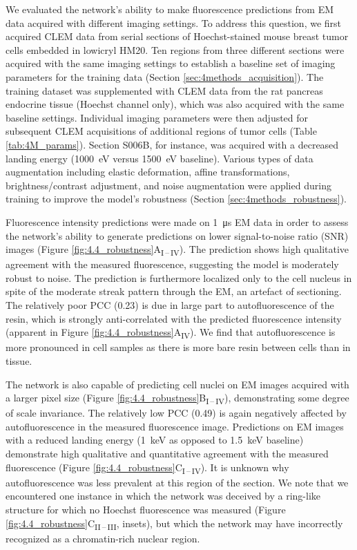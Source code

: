 We evaluated the network's ability to make fluorescence predictions from EM data acquired with different imaging settings. To address this question, we first acquired CLEM data from serial sections of Hoechst-stained mouse breast tumor cells embedded in lowicryl HM20. Ten regions from three different sections were acquired with the same imaging settings to establish a baseline set of imaging parameters for the training data (Section \ref{sec:4methods_acquisition}). The training dataset was supplemented with CLEM data from the rat pancreas endocrine tissue (Hoechst channel only), which was also acquired with the same baseline settings. Individual imaging parameters were then adjusted for subsequent CLEM acquisitions of additional regions of tumor cells (Table \ref{tab:4M_params}). Section S006B, for instance, was acquired with a decreased landing energy (\SI{1000}{\electronvolt} versus \SI{1500}{\electronvolt} baseline). Various types of data augmentation including elastic deformation, affine transformations, brightness/contrast adjustment, and noise augmentation were applied during training to improve the model's robustness (Section \ref{sec:4methods_robustness}).

Fluorescence intensity predictions were made on \SI{1}{\micro\second} EM data in order to assess the network's ability to generate predictions on lower signal-to-noise ratio (SNR) images (Figure \ref{fig:4.4_robustness}A\textsubscript{I\,--\,IV}). The prediction shows high qualitative agreement with the measured fluorescence, suggesting the model is moderately robust to noise. The prediction is furthermore localized only to the cell nucleus in spite of the moderate streak pattern through the EM, an artefact of sectioning. The relatively poor PCC (0.23) is due in large part to autofluorescence of the resin, which is strongly anti-correlated with the predicted fluorescence intensity (apparent in Figure \ref{fig:4.4_robustness}A\textsubscript{IV}). We find that autofluorescence is more pronounced in cell samples as there is more bare resin between cells than in tissue.

The network is also capable of predicting cell nuclei on EM images acquired with a larger pixel size (Figure \ref{fig:4.4_robustness}B\textsubscript{I\,--\,IV}), demonstrating some degree of scale invariance. The relatively low PCC (0.49) is again negatively affected by autofluorescence in the measured fluorescence image. Predictions on EM images with a reduced landing energy (\SI{1}{\kilo\electronvolt} as opposed to \SI{1.5}{\kilo\electronvolt} baseline) demonstrate high qualitative and quantitative agreement with the measured fluorescence (Figure \ref{fig:4.4_robustness}C\textsubscript{I\,--\,IV}). It is unknown why autofluorescence was less prevalent at this region of the section. We note that we encountered one instance in which the network was deceived by a ring-like structure for which no Hoechst fluorescence was measured (Figure \ref{fig:4.4_robustness}C\textsubscript{II\,--\,III}, insets), but which the network may have incorrectly recognized as a chromatin-rich nuclear region.

